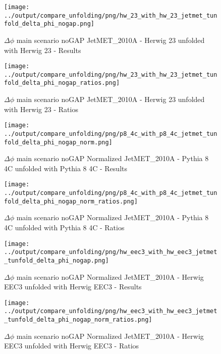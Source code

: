 \documentclass[11pt]{book}
\begin{document}
\begin{figure}[ht]
\centering
\texttt{[image: ../output/compare\_unfolding/png/hw\_23\_with\_hw\_23\_jetmet\_tunfold\_delta\_phi\_nogap.png]}
\caption{$\Delta\phi$ main scenario noGAP JetMET\_2010A - Herwig 23 unfolded with Herwig 23 - Results}
\label{hw_23_hw_23_jetmet_tunfold_delta_phi_nogap_a}
\end{figure}

\begin{figure}[ht]
\centering
\texttt{[image: ../output/compare\_unfolding/png/hw\_23\_with\_hw\_23\_jetmet\_tunfold\_delta\_phi\_nogap\_ratios.png]}
\caption{$\Delta\phi$ main scenario noGAP JetMET\_2010A - Herwig 23 unfolded with Herwig 23 - Ratios}
\label{hw_23_hw_23_jetmet_tunfold_delta_phi_nogap_b}
\end{figure}

\begin{figure}[ht]
\centering
\texttt{[image: ../output/compare\_unfolding/png/p8\_4c\_with\_p8\_4c\_jetmet\_tunfold\_delta\_phi\_nogap\_norm.png]}
\caption{$\Delta\phi$ main scenario noGAP Normalized JetMET\_2010A - Pythia 8 4C unfolded with Pythia 8 4C - Results}
\label{p8_p8_jetmet_tunfold_delta_phi_nogap_norm_a}
\end{figure}

\begin{figure}[ht]
\centering
\texttt{[image: ../output/compare\_unfolding/png/p8\_4c\_with\_p8\_4c\_jetmet\_tunfold\_delta\_phi\_nogap\_norm\_ratios.png]}
\caption{$\Delta\phi$ main scenario noGAP Normalized JetMET\_2010A - Pythia 8 4C unfolded with Pythia 8 4C - Ratios}
\label{p8_p8_jetmet_tunfold_delta_phi_nogap_norm_b}
\end{figure}

\begin{figure}[ht]
\centering
\texttt{[image: ../output/compare\_unfolding/png/hw\_eec3\_with\_hw\_eec3\_jetmet\_tunfold\_delta\_phi\_nogap.png]}
\caption{$\Delta\phi$ main scenario noGAP Normalized JetMET\_2010A - Herwig EEC3 unfolded with Herwig EEC3 - Results}
\label{hw_eec3_hw_eec3_jetmet_tunfold_delta_phi_nogap_norm_a}
\end{figure}

\begin{figure}[ht]
\centering
\texttt{[image: ../output/compare\_unfolding/png/hw\_eec3\_with\_hw\_eec3\_jetmet\_tunfold\_delta\_phi\_nogap\_norm\_ratios.png]}
\caption{$\Delta\phi$ main scenario noGAP Normalized JetMET\_2010A - Herwig EEC3 unfolded with Herwig EEC3 - Ratios}
\label{hw_eec3_hw_eec3_jetmet_tunfold_delta_phi_nogap_norm_b}
\end{figure}
\end{document}

